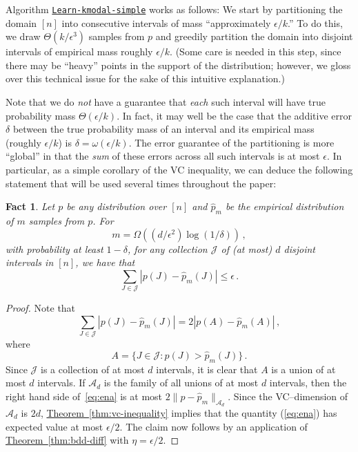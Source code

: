 \documentclass[10pt]{article}
\newtheorem{fact}[theorem]{Fact}
\theoremstyle{definition}
\numberwithin{equation}{section}
\newcommand{\expref}[2]{\texorpdfstring{\hyperref[#2]{#1~\ref{#2}}}{#1~\ref{#2}}}
\newcommand{\algorithml}[1]{{\normalfont\texttt{#1}}}
\newcommand{\eps}{\epsilon}
\begin{document}
%
%
Algorithm
\hyperref[alg:learn-kmodal-simple]{\algorithml{Learn-kmodal-simple}} works as follows: We start by partitioning
the domain $[n]$ into consecutive intervals of mass ``approximately $\eps/k$.''
To do this, {we draw $\Theta(k/\eps^3)$ samples from $p$ and greedily partition the domain  {into} disjoint intervals of 
empirical mass roughly $\eps/k$.} (Some care is needed in this step, since there may be ``heavy'' points in the support of the distribution;
however, we gloss over this technical issue for the sake of this intuitive explanation.)
{Note that we do \emph{not} have a guarantee that \emph{each} such interval will have true probability mass $\Theta(\eps/k)$. 
In fact, it may well be the case that the additive error $\delta$ between the true probability mass of an interval and its empirical mass
(roughly $\eps/k$) is $\delta = \omega(\eps/k)$.
The error guarantee of the partitioning is more ``global''  in that the \emph{sum} of these errors across all such intervals 
is at most $\eps$. In particular,  as a simple corollary of the VC inequality, we can deduce 
the following statement that will be used several times throughout the paper:

\begin{fact} \label{fact:vc}
Let $p$ be any distribution over $[n]$ and $\widehat{p}_m$ be the empirical distribution of $m$ samples from $p$.  
For 
\[
m = \Omega\left( (d/\eps^2) \log(1/\delta) \right)\,,
\]
with probability at least $1-\delta$, 
for \emph{any} collection $\mathcal{J}$ of (at most) $d$ disjoint intervals in $[n]$, we have that 
$$ \sum_{J \in \mathcal{J}} |p(J) - \widehat{p}_m(J)|  \le \eps\,.$$
\end{fact}

\begin{proof}
Note that 
\begin{equation} \label{eq:ena}
\sum_{J \in \mathcal{J}} |p(J) - \widehat{p}_m(J)|   = 2 |p(A) - \widehat{p}_m(A) |\,,
\end{equation}
where 
\[
A = \{J \in \mathcal{J} : p(J) >  \widehat{p}_m(J) \}\,.
\]
Since $\mathcal{J}$ is a collection of at most $d$ intervals, 
it is clear that $A$ is a union of at most $d$ intervals.
If $\mathcal{A}_d$ is the family of all unions of at most $d$ intervals, then the right hand side of~\eqref{eq:ena} is at most $2 \| p - \widehat{p}_m \|_{\mathcal{A}_d}$.
Since the VC--dimension of $\mathcal{A}_d$ is $2d$, \expref{Theorem}{thm:vc-inequality} implies that the quantity (\ref{eq:ena}) has expected value at most  {$\eps/2$}.
The claim now follows by an application of \expref{Theorem}{thm:bdd-diff} with  {$\eta = \eps/2$}.
\end{proof}}
\end{document}
